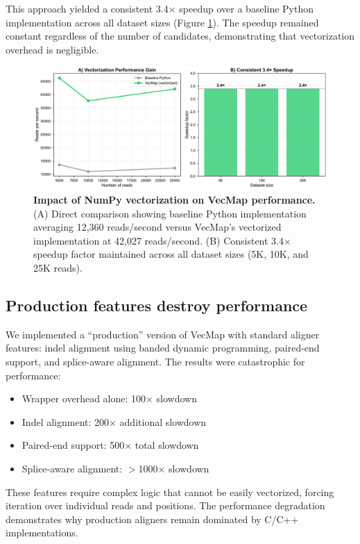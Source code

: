 \documentclass[12pt]{article}
\begin{document}
This approach yielded a consistent 3.4× speedup over a baseline Python implementation across all dataset sizes (Figure \ref{fig:vectorization}). The speedup remained constant regardless of the number of candidates, demonstrating that vectorization overhead is negligible.

\begin{figure}[H]
\centering
\includegraphics[width=\textwidth]{docs/figures/figure3_vectorization.pdf}
\caption{\textbf{Impact of NumPy vectorization on VecMap performance.} (A) Direct comparison showing baseline Python implementation averaging 12,360 reads/second versus VecMap's vectorized implementation at 42,027 reads/second. (B) Consistent 3.4× speedup factor maintained across all dataset sizes (5K, 10K, and 25K reads).}
\label{fig:vectorization}
\end{figure}

\subsection{Production features destroy performance}

We implemented a ``production'' version of VecMap with standard aligner features: indel alignment using banded dynamic programming, paired-end support, and splice-aware alignment. The results were catastrophic for performance:

\begin{itemize}
\item Wrapper overhead alone: 100× slowdown
\item Indel alignment: 200× additional slowdown
\item Paired-end support: 500× total slowdown
\item Splice-aware alignment: $>$1000× slowdown
\end{itemize}

These features require complex logic that cannot be easily vectorized, forcing iteration over individual reads and positions. The performance degradation demonstrates why production aligners remain dominated by C/C++ implementations.
\end{document}
